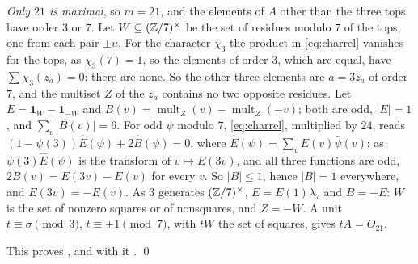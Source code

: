 \emph{Only $21$ is maximal}, so $m=21$, and the elements of $A$ other than the
three tops have order $3$ or $7$. Let $W\subseteq(\mathbb{Z}/7)^{\times}$ be the set
of residues modulo $7$ of the tops, one from each pair $\pm u$. For the
character $\chi_{3}$ the product in \eqref{eq:charrel} vanishes for the tops,
as $\chi_{3}(7)=1$, so the elements of order $3$, which are equal, have
$\sum\chi_{3}(z_{a})=0$: there are none. So the other three elements are
$a=3z_{a}$ of order $7$, and the multiset $Z$ of the $z_{a}$ contains no two
opposite residues. Let $E=\mathbf 1_{W}-\mathbf 1_{-W}$ and
$B(v)=\operatorname{mult}_{Z}(v)-\operatorname{mult}_{Z}(-v)$; both are odd,
$|E|=1$, and $\sum_{v}|B(v)|=6$. For odd $\psi$ modulo $7$,
\eqref{eq:charrel}, multiplied by $24$, reads
$(1-\psi(3))\hat E(\psi)+2\hat B(\psi)=0$, where $\hat E(\psi)=\sum_{v}E(v)
\bar\psi(v)$; as $\psi(3)\hat E(\psi)$ is the transform of $v\mapsto E(3v)$,
and all three functions are odd, $2B(v)=E(3v)-E(v)$ for every $v$. So
$|B|\le1$, hence $|B|=1$ everywhere, and $E(3v)=-E(v)$. As $3$ generates
$(\mathbb{Z}/7)^{\times}$, $E=E(1)\lambda_{7}$ and $B=-E$: $W$ is the set of nonzero
squares or of nonsquares, and $Z=-W$. A unit $t\equiv\sigma\pmod3$, $t\equiv\pm1\pmod7$, with $tW$ the set of
squares, gives $tA=O_{21}$.

This proves , and with it . \qed
